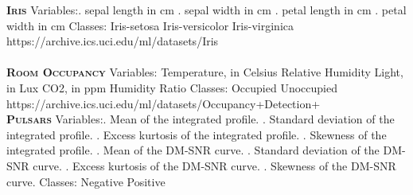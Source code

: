 \documentclass[a4paper,11pt,twoside]{article}
\begin{document}
\textsc{\large \bf Iris}\newline
Variables:. sepal length in cm . sepal width in cm . petal length in cm . petal width in cm \newline
Classes:
\newline
Iris-setosa\newline
Iris-versicolor\newline
Iris-virginica\newline
https://archive.ics.uci.edu/ml/datasets/Iris
\\~\\
\textsc{\large \bf Room Occupancy}\newline
Variables:\newline
Temperature, in Celsius \newline
Relative Humidity \newline
Light, in Lux \newline
CO2, in ppm \newline
Humidity Ratio\newline
Classes:  Occupied  Unoccupied \newline
https://archive.ics.uci.edu/ml/datasets/Occupancy+Detection+\newline
\\
\textsc{\large \bf Pulsars}\newline
Variables:. Mean of the integrated profile. . Standard deviation of the integrated profile. . Excess kurtosis of the integrated profile. . Skewness of the integrated profile. . Mean of the DM-SNR curve. . Standard deviation of the DM-SNR curve. . Excess kurtosis of the DM-SNR curve. . Skewness of the DM-SNR curve. \newline
Classes: Negative Positive\newline
\end{document}
